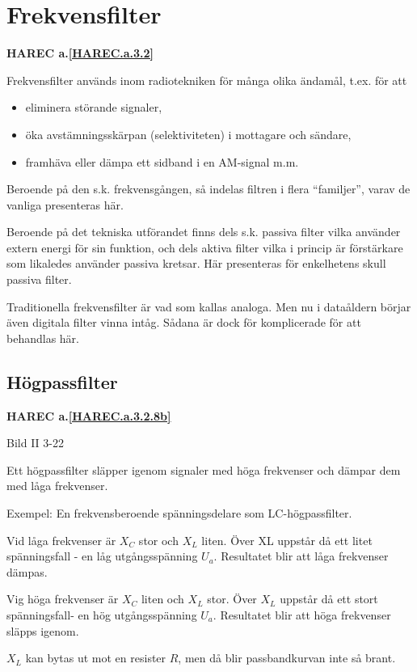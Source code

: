 \section{Frekvensfilter}
\textbf{HAREC a.\ref{HAREC.a.3.2}\label{myHAREC.a.3.2}}


Frekvensfilter används inom radiotekniken för många olika ändamål, t.ex. för att
\begin{itemize}
\item eliminera störande signaler,
\item  öka avstämningsskärpan (selektiviteten) i mottagare och sändare,
\item framhäva eller dämpa ett sidband i en AM-signal m.m.
\end{itemize}

Beroende på den s.k. frekvensgången, så indelas filtren i flera ``familjer'',
varav de vanliga presenteras här.

Beroende på det tekniska utförandet finns dels s.k. passiva filter vilka
använder extern energi för sin funktion, och dels aktiva filter vilka i princip
är förstärkare som likaledes använder passiva kretsar. Här presenteras
för enkelhetens skull passiva filter.

Traditionella frekvensfilter är vad som kallas analoga. Men nu i dataåldern
börjar även digitala filter vinna intåg. Sådana är dock för komplicerade för
att behandlas här.

\subsection{Högpassfilter}
\textbf{HAREC a.\ref{HAREC.a.3.2.8b}\label{myHAREC.a.3.2.8b}}

Bild II 3-22

Ett högpassfilter släpper igenom signaler med höga frekvenser och dämpar dem med
låga frekvenser.

Exempel: En frekvensberoende spänningsdelare som LC-högpassfilter.

Vid låga frekvenser är \(X_C\) stor och \(X_L\) liten. Över XL uppstår då ett
litet spänningsfall - en låg utgångsspänning \(U_a\). Resultatet blir att
låga frekvenser dämpas.

Vig höga frekvenser är \(X_C\) liten och \(X_L\) stor. Över \(X_L\) uppstår då
ett stort spänningsfall- en hög utgångsspänning \(U_a\). Resultatet blir att
höga frekvenser släpps igenom.

\(X_L\) kan bytas ut mot en resister \(R\), men då blir passbandkurvan inte så
brant.

